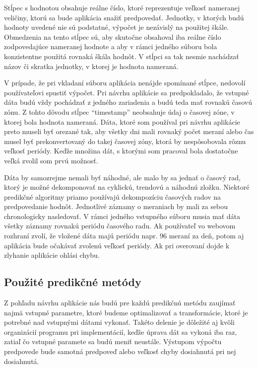 \documentclass[a4paper,slovak,12pt,appendix]{article}
\begin{document}
Stĺpec s hodnotou obsahuje reálne číslo, ktoré reprezentuje veľkosť nameranej
veličiny, ktorú sa bude aplikácia snažiť predpovedať. Jednotky, v ktorých budú hodnoty
uvedené nie sú podstatné, výpočet je nezávislý na použitej škále. Obmedzenia
na tento stĺpec sú, aby skutočne obsahoval iba reálne číslo zodpovedajúce
nameranej hodnote a aby v rámci jedného súboru bola konzistentne použitá
rovnaká škála hodnôt. V stĺpci sa tak nesmie nachádzať názov či skratka
jednotky, v ktorej je hodnota nameraná.

V prípade, že pri vkladaní súboru aplikácia nenájde spomínané stĺpce, nedovolí
používateľovi spustiť výpočet. Pri návrhu aplikácie sa predpokladalo, že vstupné
dáta budú vždy pochádzať z jedného zariadenia a budú teda mať rovnakú časovú
zónu. Z tohto dôvodu stĺpec ``timestamp'' neobsahuje údaj o časovej zóne,
v ktorej bola hodnota nameraná. Dáta, ktoré som používal pri návrhu aplikácie
preto museli byť orezané tak, aby všetky dni mali rovnaký počet meraní alebo
čas musel byť prekonvertovaný do takej časovej zóny, ktorá by nespôsobovala
rôznu veľkosť periódy. Keďže množina dát, s ktorými som pracoval bola dostatočne
veľká zvolil som prvú možnosť.

Dáta by samozrejme nemali byť náhodné, ale malo by sa jednať o časový rad,
ktorý je možné dekomponovať na cyklickú, trendovú a náhodnú zložku. Niektoré
predikčné algoritmy priamo používajú dekompozíciu časových radov na
predpovedanie hodnôt. Jednotlivé záznamy o meraniach by mali za sebou
chronologicky nasledovať. V rámci jedného vstupného súboru musia mať dáta
všetky záznamy rovnakú periódu časového radu. Ak používateľ vo webovom rozhraní
zvolí, že vložené dáta majú periódu napr. 96 meraní za deň, potom aj aplikácia
bude očakávať zvolenú veľkosť periódy. Ak pri overovaní dojde k zlyhanie
aplikácie ohlási chybu.


\subsection{Použité predikčné metódy}
Z pohľadu návrhu aplikácie nás budú pre každú predikčnú metódu zaujímať najmä
vstupné parametre, ktoré budeme optimalizovať a transformácie, ktoré je
potrebné nad vstupnými dátami vykonať. Takéto delenie je dôležité aj kvôli
organizácií programu pri implementácií, keďže úprava dát sa vykoná iba raz,
zatiaľ čo vstupné paramete sa budú meniť neustále. Výstupom výpočtu predpovede
bude samotná predpoveď alebo veľkosť chyby dosiahnutá pri nej dosiahnutá.
\end{document}
